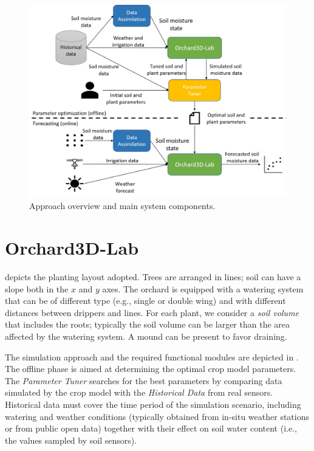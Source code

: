 \begin{figure}[t]
	\centering
	\includegraphics[scale=.5]{chapters/physics-aware/orchard/img/overview3.png}
	\caption{Approach overview and main system components.}
	\label{orchard-fig:overview}
\end{figure}


\section{Orchard3D-Lab}

 depicts the planting layout adopted.
 Trees are arranged in lines; soil can have a slope both in the $x$ and $y$ axes. The orchard is equipped with a watering system that can be of different type (e.g., single or double wing) and with different distances between drippers and lines. For each plant, we consider a \emph{soil volume} that includes the roots; typically the soil volume can be larger than the area affected by the watering system. A mound can be present to favor draining.

The simulation approach and the required functional modules are depicted in . The offline phase is aimed at determining the optimal crop model parameters. The \emph{Parameter Tuner} searches for the best parameters by comparing data simulated by the crop model with the \emph{Historical Data} from real sensors.
Historical data must cover the time period of the simulation scenario, including watering and weather conditions (typically obtained from in-situ weather stations or from public open data) together with their effect on soil water content (i.e., the values sampled by soil sensors).

